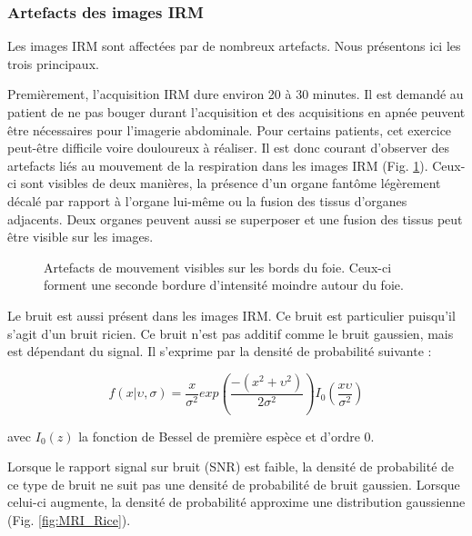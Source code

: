 \subsubsection{Artefacts des images IRM}

Les images IRM sont affectées par de nombreux artefacts. Nous présentons ici les trois principaux.

Premièrement, l'acquisition IRM dure environ 20 à 30 minutes. Il est demandé au patient de ne pas bouger durant l'acquisition et des acquisitions en apnée peuvent être nécessaires pour l'imagerie abdominale. Pour certains patients, cet exercice peut-être difficile voire douloureux à réaliser. Il est donc courant d'observer des artefacts liés au mouvement de la respiration dans les images IRM (Fig. \ref{fig:MRI_movement}). Ceux-ci sont visibles de deux manières, la présence d'un organe fantôme légèrement décalé par rapport à l'organe lui-même ou la fusion des tissus d'organes adjacents. Deux organes peuvent aussi se superposer et une fusion des tissus peut être visible sur les images.

\begin{figure}
    \centering
    \caption{Artefacts de mouvement visibles sur les bords du foie. Ceux-ci forment une seconde bordure d'intensité moindre autour du foie.}
    \label{fig:MRI_movement}
\end{figure}

Le bruit est aussi présent dans les images IRM. Ce bruit est particulier puisqu'il s'agit d'un bruit ricien. Ce bruit n'est pas additif comme le bruit gaussien, mais est dépendant du signal. Il s'exprime par la densité de probabilité suivante : 

\begin{equation}
    f(x | \upsilon, \sigma) = \frac{x}{\sigma^2} exp ( \frac{-(x^2 + \upsilon^2)}{2\sigma^2} ) I_0 (\frac{x\upsilon}{\sigma^2})
    \end{equation}

avec $I_0(z)$ la fonction de Bessel de première espèce et d'ordre 0. 

Lorsque le rapport signal sur bruit (SNR) est faible, la densité de probabilité de ce type de bruit ne suit pas une densité de probabilité de bruit gaussien. Lorsque celui-ci augmente, la densité de probabilité approxime une distribution gaussienne (Fig. \ref{fig:MRI_Rice}).

